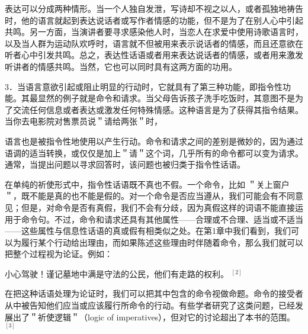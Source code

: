 表达可以分成两种情形。当一个人独自发泄，写诗却不视之以人，或者孤独地祷告时，他的语言就起到表达说话者或写作者情感的功能，但不是为了在别人心中引起共鸣。另一方面，当演讲者要寻求感染他人时，当恋人在求爱中使用诗歌语言时，以及当人群为运动队欢呼时，语言就不但被用来表示说话者的情感，而且还意欲在听者心中引发共鸣。总之，表达性话语或者用来表达说话者的情感，或者用来激发听讲者的情感共鸣。当然，它也可以同时具有这两方面的功用。

3．当语言意欲引起或阻止明显的行动时，它就具有了第三种功能，即指令性功能。其最显然的例子就是命令和请求。当父母告诉孩子洗手吃饭时，其意图不是为了交流任何信息或者表达或激发任何特殊情感。这种语言是为了获得其指令结果。当你去电影院对售票员说＂请给两张＂时，

语言也是被指令性地使用以产生行动。命令和请求之间的差别是微妙的，因为通过语调的适当转换，或仅仅是加上＂请＂这个词，几乎所有的命令都可以变为请求。通常，当提出问题以寻求回答时，该问题也被归类于指令性话语。

在单纯的祈使形式中，指令性话语既不真也不假。一个命令，比如 ＂关上窗户＂，既不能是真的也不能是假的。对一个命令是否应当遵从，我们可能会有不同意见；但是，对命令是否有真假，我们不会有分歧，因为真假这样的词语不能直接运用于命令句。不过，命令和请求还具有其他属性——合理或不合理、适当或不适当——这些属性与信息性话语的真或假有相类似之处。在第1章中我们看到，我们可以为履行某个行动给出理由，而如果陈述这些理由时伴随着命令，那么我们就可以把整个过程视为论证。例如：

\begin{displayquote}
小心驾驶！谨记墓地中满是守法的公民，他们有走路的权利。 ${ }^{[2]}$
\end{displayquote}

在把这种话语处理为论证时，我们可以把其中包含的命令视做命题。命令的接受者从中被告知他们应当或应该履行所命令的行动。有些学者研究了这类问题，已经发展出了＂祈使逻辑＂（logic of imperatives），但对它的讨论超出了本书的范围。 ${ }^{[3]}$ 